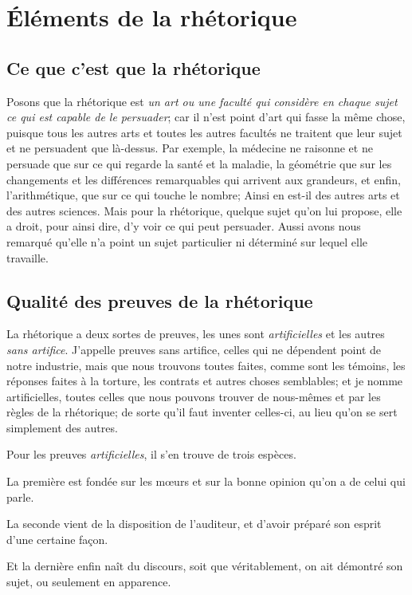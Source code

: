 
\section{Éléments de la rhétorique}

\subsection{Ce que c'est que la rhétorique}

Posons que la rhétorique est \emph{un art ou une faculté qui considère en chaque sujet ce qui est capable de le persuader}; car il n'est point d'art
qui fasse la même chose, puisque tous les autres arts et toutes les autres facultés ne traitent que leur sujet et ne persuadent que là-dessus. Par
exemple, la médecine ne raisonne et ne persuade que sur ce qui regarde la santé et la maladie, la géométrie que sur les changements et les différences
remarquables qui arrivent aux grandeurs, et enfin, l'arithmétique, que sur ce qui touche le nombre; Ainsi en est-il des autres arts et des autres
sciences. Mais pour la rhétorique, quelque sujet qu'on lui propose, elle a droit, pour ainsi dire, d'y voir ce qui peut persuader. Aussi avons nous
remarqué qu'elle n'a point un sujet particulier ni déterminé sur lequel elle travaille. 

\subsection{Qualité des preuves de la rhétorique}

La rhétorique a deux sortes de preuves, les unes sont \emph{artificielles} et les autres \emph{sans artifice}. J'appelle preuves sans artifice, celles
qui ne dépendent point de notre industrie, mais que nous trouvons toutes faites, comme sont les témoins, les réponses faites à la torture, les contrats
et autres choses semblables; et je nomme artificielles, toutes celles que nous pouvons trouver de nous-mêmes et par les règles  de la rhétorique; de
sorte qu'il faut inventer celles-ci, au lieu qu'on se sert simplement des autres.

Pour les preuves \emph{artificielles}, il s'en trouve de trois espèces.

La première est fondée sur les mœurs et sur la bonne opinion qu'on a de celui qui parle.

La seconde vient de la disposition de l'auditeur, et d'avoir préparé son esprit d'une certaine façon.

Et la dernière enfin naît du discours, soit que véritablement, on ait démontré son sujet, ou seulement en apparence.

